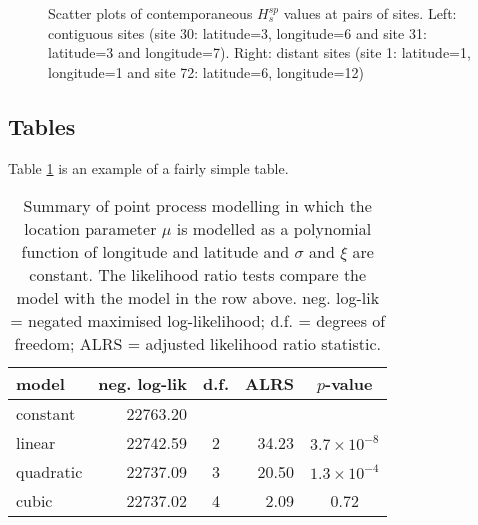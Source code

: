 \documentclass[a4paper,12pt,titlepage]{article} %
\numberwithin{equation}{section}  %
\begin{document}
\begin{figure}[h]    %
\centering           %
\vspace*{-0.25cm}    %
\caption{Scatter plots of contemporaneous $H^{sp}_s$ values at pairs of sites.  Left: contiguous sites (site 30: latitude=3, longitude=6 and site 31: latitude=3 and longitude=7). Right: distant sites (site 1: latitude=1, longitude=1 and site 72: latitude=6, longitude=12)}          %
\label{fig:space_dep}               %
\end{figure}                        %

\subsection{Tables}
\label{sec:tables}
Table \ref{tab:simple} is an example of a fairly simple table.

\renewcommand{\arraystretch}{1.1} %
\begin{table}[h]                  %
\centering
\begin{tabular}{lrcrc}            %
\\ \hline                         %
model   &  neg. log-lik & d.f. & ALRS        & $p$-value \\ \hline           %
constant &  22763.20    &       &                &   \\                      %
linear     &  22742.59    &  2   & 34.23       & $3.7 \times 10^{-8}$ \\     %
quadratic & 22737.09     &  3   & 20.50       & $1.3 \times 10^{-4}$ \\
cubic       & 22737.02     &  4   & 2.09         & 0.72 \\ \hline
\end{tabular}                     %
\caption{Summary of point process modelling in which the location parameter $\mu$ is modelled as a polynomial function of longitude and latitude and $\sigma$ and $\xi$ are constant.  The likelihood ratio tests compare the model with the model in the row above. neg. log-lik = negated maximised log-likelihood; d.f. = degrees of freedom; ALRS = adjusted likelihood ratio statistic.}
\label{tab:simple}
\end{table}
\renewcommand{\arraystretch}{1}  %
\end{document}
